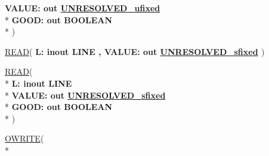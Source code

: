 \begin{DoxyCompactItemize}
  {\bfseries \textcolor{vhdlchar}{ }\textcolor{vhdlchar}{V\+A\+L\+U\+E\+: }\textcolor{stringliteral}{} {\bfseries \textcolor{keywordflow}{out}\textcolor{vhdlchar}{ }{\bfseries \hyperlink{classfixed__pkg_ae78bc2b36d22f6abeac163955e8a587d}{U\+N\+R\+E\+S\+O\+L\+V\+E\+D\+\_\+ufixed}} \textcolor{vhdlchar}{ }}}\\*
  {\bfseries \textcolor{vhdlchar}{ }\textcolor{vhdlchar}{G\+O\+O\+D\+: }\textcolor{stringliteral}{} {\bfseries \textcolor{keywordflow}{out}\textcolor{vhdlchar}{ }\textcolor{comment}{B\+O\+O\+L\+E\+A\+N}\textcolor{vhdlchar}{ }}}\\*
   )
\item 
{\bfseries {\bfseries \textcolor{vhdlchar}{ }}} \hyperlink{classfixed__pkg_a1b1262258b9fb1a68fec2aad83940efe}{R\+E\+A\+D}( {\bfseries \textcolor{vhdlchar}{ }\textcolor{vhdlchar}{L\+: }\textcolor{stringliteral}{} {\bfseries \textcolor{keywordflow}{inout}\textcolor{vhdlchar}{ }\textcolor{vhdlchar}{L\+I\+N\+E}\textcolor{vhdlchar}{ }}}{\bfseries ,\textcolor{vhdlchar}{ }\textcolor{vhdlchar}{V\+A\+L\+U\+E\+: }\textcolor{stringliteral}{} {\bfseries \textcolor{keywordflow}{out}\textcolor{vhdlchar}{ }{\bfseries \hyperlink{classfixed__pkg_aa723b28a027c3c0f9bca02d75e8df4d6}{U\+N\+R\+E\+S\+O\+L\+V\+E\+D\+\_\+sfixed}} \textcolor{vhdlchar}{ }}} )
\item 
{\bfseries {\bfseries \textcolor{vhdlchar}{ }}} \hyperlink{classfixed__pkg_ae7e16de39ab0d01050084742fd86814f}{R\+E\+A\+D}( \\*
{\bfseries \textcolor{vhdlchar}{ }\textcolor{vhdlchar}{L\+: }\textcolor{stringliteral}{} {\bfseries \textcolor{keywordflow}{inout}\textcolor{vhdlchar}{ }\textcolor{vhdlchar}{L\+I\+N\+E}\textcolor{vhdlchar}{ }}}\\*
  {\bfseries \textcolor{vhdlchar}{ }\textcolor{vhdlchar}{V\+A\+L\+U\+E\+: }\textcolor{stringliteral}{} {\bfseries \textcolor{keywordflow}{out}\textcolor{vhdlchar}{ }{\bfseries \hyperlink{classfixed__pkg_aa723b28a027c3c0f9bca02d75e8df4d6}{U\+N\+R\+E\+S\+O\+L\+V\+E\+D\+\_\+sfixed}} \textcolor{vhdlchar}{ }}}\\*
  {\bfseries \textcolor{vhdlchar}{ }\textcolor{vhdlchar}{G\+O\+O\+D\+: }\textcolor{stringliteral}{} {\bfseries \textcolor{keywordflow}{out}\textcolor{vhdlchar}{ }\textcolor{comment}{B\+O\+O\+L\+E\+A\+N}\textcolor{vhdlchar}{ }}}\\*
   )
\item 
{\bfseries {\bfseries \textcolor{vhdlchar}{ }}} \hyperlink{classfixed__pkg_a9845534e1a1f2114d31398adc2e4c1f0}{O\+W\+R\+I\+T\+E}( \\*

\end{DoxyCompactItemize}
